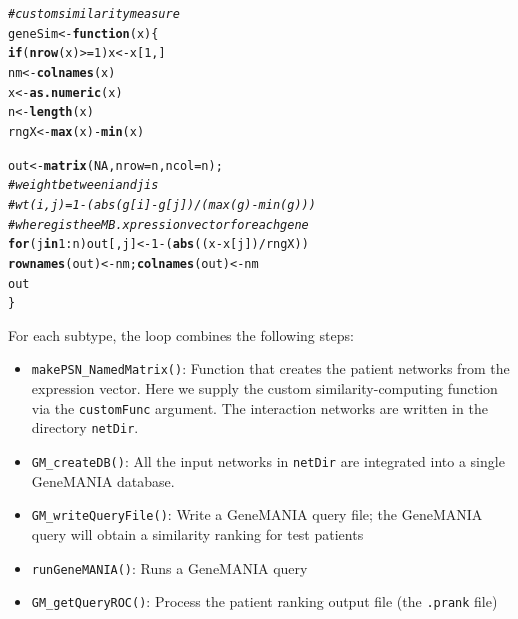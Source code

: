 \documentclass{article}\usepackage[]{graphicx}\usepackage[]{color}
\makeatletter
\newcommand{\hlnum}[1]{\textcolor[rgb]{0.686,0.059,0.569}{#1}}%
\newcommand{\hlcom}[1]{\textcolor[rgb]{0.678,0.584,0.686}{\textit{#1}}}%
\newcommand{\hlopt}[1]{\textcolor[rgb]{0,0,0}{#1}}%
\newcommand{\hlstd}[1]{\textcolor[rgb]{0.345,0.345,0.345}{#1}}%
\newcommand{\hlkwa}[1]{\textcolor[rgb]{0.161,0.373,0.58}{\textbf{#1}}}%
\newcommand{\hlkwb}[1]{\textcolor[rgb]{0.69,0.353,0.396}{#1}}%
\newcommand{\hlkwc}[1]{\textcolor[rgb]{0.333,0.667,0.333}{#1}}%
\newcommand{\hlkwd}[1]{\textcolor[rgb]{0.737,0.353,0.396}{\textbf{#1}}}%
\newenvironment{kframe}{%
 \def\at@end@of@kframe{}%
 \ifinner\ifhmode%
  \def\at@end@of@kframe{\end{minipage}}%
  \begin{minipage}{\columnwidth}%
 \fi\fi%
 \def\FrameCommand##1{\hskip\@totalleftmargin \hskip-\fboxsep
 \colorbox{shadecolor}{##1}\hskip-\fboxsep
     \hskip-\linewidth \hskip-\@totalleftmargin \hskip\columnwidth}%
 \MakeFramed {\advance\hsize-\width
   \@totalleftmargin\z@ \linewidth\hsize
   \@setminipage}}%
 {\par\unskip\endMakeFramed%
 \at@end@of@kframe}
\newenvironment{knitrout}{}{} %
\makeatother
\begin{document}
\begin{knitrout}
\color{fgcolor}\begin{kframe}
\begin{alltt}
\hlcom{# custom similarity measure}
\hlstd{geneSim} \hlkwb{<-} \hlkwa{function}\hlstd{(}\hlkwc{x}\hlstd{) \{}
    \hlkwa{if} \hlstd{(}\hlkwd{nrow}\hlstd{(x)}\hlopt{>=}\hlnum{1}\hlstd{) x} \hlkwb{<-} \hlstd{x[}\hlnum{1}\hlstd{,]}
    \hlstd{nm} \hlkwb{<-} \hlkwd{colnames}\hlstd{(x)}
    \hlstd{x} \hlkwb{<-} \hlkwd{as.numeric}\hlstd{(x)}
    \hlstd{n} \hlkwb{<-} \hlkwd{length}\hlstd{(x)}
    \hlstd{rngX}  \hlkwb{<-} \hlkwd{max}\hlstd{(x)}\hlopt{-}\hlkwd{min}\hlstd{(x)}

    \hlstd{out} \hlkwb{<-} \hlkwd{matrix}\hlstd{(}\hlnum{NA}\hlstd{,}\hlkwc{nrow}\hlstd{=n,}\hlkwc{ncol}\hlstd{=n);}
    \hlcom{# weight between i and j is}
    \hlcom{# wt(i,j) = 1 - (abs(g[i]-g[j])/(max(g)-min(g)))}
    \hlcom{# where g is the eMB.xpression vector for each gene}
    \hlkwa{for} \hlstd{(j} \hlkwa{in} \hlnum{1}\hlopt{:}\hlstd{n) out[,j]} \hlkwb{<-} \hlnum{1}\hlopt{-}\hlstd{(}\hlkwd{abs}\hlstd{((x}\hlopt{-}\hlstd{x[j])}\hlopt{/}\hlstd{rngX))}
    \hlkwd{rownames}\hlstd{(out)} \hlkwb{<-} \hlstd{nm;} \hlkwd{colnames}\hlstd{(out)}\hlkwb{<-} \hlstd{nm}
    \hlstd{out}
\hlstd{\}}
\end{alltt}
\end{kframe}
\end{knitrout}

For each subtype, the loop combines the following steps:
\begin{itemize}
\item \texttt{makePSN\_NamedMatrix()}: Function that creates the patient networks from the expression vector. Here we supply the custom similarity-computing function via the \texttt{customFunc} argument. The interaction networks are written in the directory \texttt{netDir}.
\item \texttt{GM\_createDB()}: All the input networks in \texttt{netDir} are integrated into a single GeneMANIA database.
\item \texttt{GM\_writeQueryFile()}: Write a GeneMANIA query file; the GeneMANIA query will obtain a similarity ranking for test patients
\item \texttt{runGeneMANIA()}: Runs a GeneMANIA query
\item \texttt{GM\_getQueryROC()}: Process the patient ranking output file (the \texttt{.prank} file)
\end{itemize}
\end{document}
